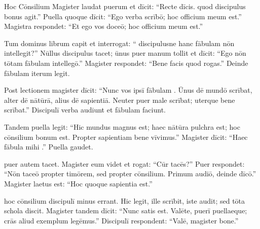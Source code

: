 \documentclass[12pt]{nextbook}
\begin{document}
\begin{readersection}{Hoc Cōnsilium}
Magister laudat puerum et dīcit: “Recte dīcis.  quod discipulus bonus agit.” Puella quoque dīcit: “Ego verba scrībō; hoc officium meum est.” Magistra respondet: “Et ego vos doceō; hoc officium meum est.”

Tum dominus librum capit et interrogat: “ discipulusne hanc fābulam nōn intellegit?” Nūllus discipulus tacet; ūnus puer manum tollit et dīcit: “Ego nōn tōtam fābulam intellegō.” Magister respondet: “Bene facis quod rogas.” Deinde fābulam iterum legit.

Post lectionem magister dīcit: “Nunc vos ipsī fābulam . Ūnus dē mundō scrībat, alter dē nātūrā, alius dē sapientiā. Neuter puer male scrībat; uterque bene scrībat.” Discipulī verba audiunt et fābulam faciunt.

Tandem puella legit: “Hic mundus magnus est; haec nātūra pulchra est; hoc cōnsilium bonum est. Propter sapientiam bene vīvimus.” Magister dīcit: “Haec fābula mihi .” Puella gaudet.

 puer autem tacet. Magister eum videt et rogat: “Cūr tacēs?” Puer respondet: “Nōn taceō propter timōrem, sed propter cōnsilium. Primum audiō, deinde dīcō.” Magister laetus est: “Hoc quoque sapientia est.”

 hoc cōnsilium discipulī minus errant. Hic legit, ille scrībit, iste audit; sed tōta schola discit. Magister tandem dīcit: “Nunc satis est. Valēte, puerī puellaeque; crās aliud exemplum legēmus.” Discipulī respondent: “Valē, magister bone.”

\end{readersection}
\end{document}
